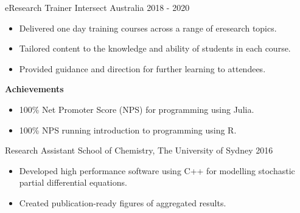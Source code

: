  \cventry
    {eResearch Trainer} %
    {Intersect Australia} %
    {} %
    {2018 - 2020} %
{%
    \begin{itemize}
        \item Delivered one day training courses across a range of eresearch topics.
        \item Tailored content to the knowledge and ability of students in each course.
        \item Provided guidance and direction for further learning to attendees.
    \end{itemize}
    \textbf{Achievements}
    \begin{itemize}
        \item 100\% Net Promoter Score (NPS) for programming using Julia.
        \item 100\% NPS running introduction to programming using R.
    \end{itemize}
}

\cventry
    {Research Assistant} %
    {School of Chemistry, The University of Sydney} %
    {} %
    {2016} %
{%
    \begin{itemize}
        \item Developed high performance software using C++ for modelling
            stochastic partial differential equations.
        \item Created publication-ready figures of aggregated results.
    \end{itemize}
}
